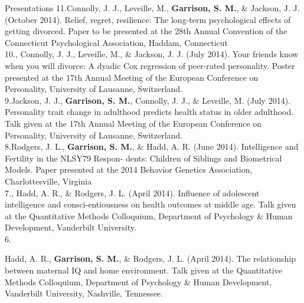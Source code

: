 \documentclass {resume}
\begin{document}
\begin{rSection}{\textrm{Presentations}}
11.\hspace* {1mm}Connolly, J. J., Leveille, M., {\bf Garrison, S. M.}, \& Jackson, J. J. (October 2014). Relief,  regret,  resilience: The  \hspace* {6 mm}long-term  psychological  effects  of  getting divorced. Paper to be presented at the 28th Annual Convention of the \hspace* {6 mm}Connecticut Psychological Association, Haddam, Connecticut\smallskip\\
10.\hspace* {1mm}{\bf Garrison, S. M.}, Connolly, J. J., Leveille, M., \& Jackson, J. J. (July 2014). Your friends know when you will \hspace* {6 mm}divorce: A dyadic Cox regression of peer-rated personality. Poster presented at the 17th Annual Meeting of the \hspace* {6 mm}European Conference on Personality, University of Lausanne, Switzerland.
\smallskip\\
9.\hspace* {2.5mm}Jackson, J. J., {\bf Garrison, 
S. M.}, Connolly, J. J., \& Leveille, M. (July 2014). Personality trait change in \hspace* {6 mm}adulthood predicts health status in older adulthood. Talk given at the 17th Annual Meeting of the European \hspace* {6 mm}Conference on Personality, University of Lausanne, Switzerland.
\smallskip\\
8.\hspace* {2.5mm}Rodgers, J. L., {\bf Garrison, S. M.}, \& Hadd, A. R. (June 2014). Intelligence and Fertility in the NLSY79 Respon-
\hspace* {6 mm}dents: Children of Siblings and Biometrical Models. Paper presented at the 2014 Behavior Genetics Association, \hspace* {6 mm}Charlottesville, Virginia 
\smallskip\\
7.\hspace* {2.5 mm}{\bf Garrison, S. M.}, Hadd, A. R., \& Rodgers, J. L. (April 2014). Influence of adolescent intelligence and consci-\hspace* {6 mm}entiousness on health outcomes at middle age. Talk given at the Quantitative Methods Colloquium, Department \hspace* {6 mm}of Psychology \& Human Development, Vanderbilt University. \smallskip\\
6.\hspace* {2.5 mm}\begin{samepage}Hadd, A. R., {\bf Garrison, S. M.}, \& Rodgers, J. L. (April 2014). The relationship between maternal IQ and \hspace* {6 mm}home environment. Talk given at the Quantitative Methods Colloquium, Department of Psychology \& Human \hspace* {6 mm}Development, Vanderbilt University, Nashville, Tennessee. \smallskip\\\end{samepage}%

\end{rSection}
\end{document}
